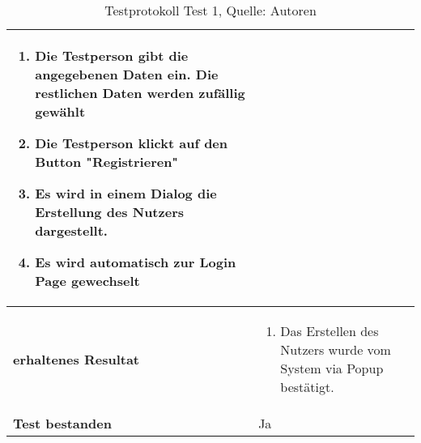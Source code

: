 \begin{table}[H]
\begin{tabularx}{\textwidth}{|l|X|}
\begin{minipage}[t]{0.6\textwidth}
            \begin{enumerate}
                \item Die Testperson gibt die angegebenen Daten ein. Die restlichen Daten werden zufällig gewählt
                \item Die Testperson klickt auf den Button "Registrieren"
                \item Es wird in einem Dialog die Erstellung des Nutzers dargestellt. 
                \item Es wird automatisch zur Login Page gewechselt
            \end{enumerate}
        \end{minipage} \\
        \hline
        \textbf{erhaltenes Resultat} &
        \begin{minipage}[t]{0.6\textwidth}
            \begin{enumerate}
                \item Das Erstellen des Nutzers wurde vom System via Popup bestätigt. 
            \end{enumerate}
        \end{minipage} \\
        \hline
        \textbf{Test bestanden} & Ja \\
        \hline
    \end{tabularx}
    \caption{ \label{tbl: testprotokoll1}Testprotokoll Test 1, Quelle: Autoren}
\end{table}

